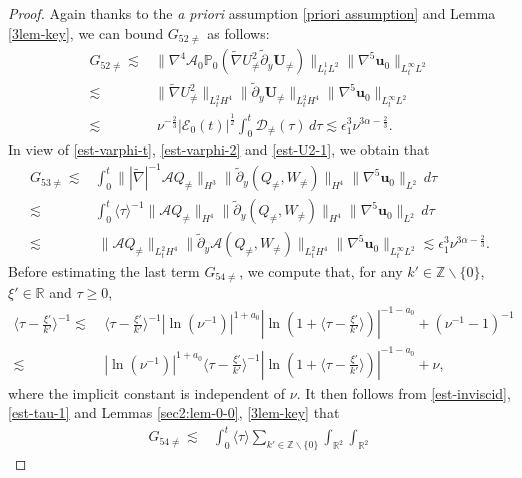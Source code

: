 \documentclass[11pt,reqno]{article}
\numberwithin{equation}{section}
\newcommand\R{{\mathbb R}}
\newcommand\Z{{\mathbb Z}}
\newcommand\PP{{\mathbb P}}
\newcommand\D{{\mathcal D}}
\newcommand\E{{\mathcal E}}
\newcommand\A{\mathcal{A}}
\newcommand\uu{\bm{u}}
\newcommand\U{\bm{U}}
\let\pa=\partial
\let\na=\nabla
\let\al=\alpha
\let\f=\frac
\let\ep=\epsilon
\begin{document}
\begin{proof}
Again thanks to the \textit{a priori} assumption \eqref{priori assumption} and Lemma \ref{3lem-key}, we can bound $G_{52\not=}$ as follows:
\begin{align}\label{est-G52noq}
    G_{52\not=}
    \lesssim &
    \|\nabla^4\A_0\PP_0(\widetilde{\nabla}U^2_{\not=}\tilde\pa_y\U_{\not=})\|_{L^1_tL^2}
    \|\nabla^5 \uu_0\|_{L^\infty_tL^2}
    \nonumber
    \\
    \lesssim &
    \|\widetilde{\nabla}U^2_{\not=}\|_{L^2_tH^4}
    \|\tilde\pa_y\U_{\not=}\|_{L^2_tH^4}
    \|\nabla^5 \uu_0\|_{L^\infty_tL^2}
    \nonumber
    \\
    \lesssim &~\nu^{-\f23} |\E_{0}(t)|^{\f12}\int_0^t \D_{\not=}(\tau)\,d\tau 
    \lesssim \ep_1^3 \nu^{3\al-\f23}.
\end{align}
In view of \eqref{est-varphi-t}, \eqref{est-varphi-2} and \eqref{est-U2-1}, we obtain that
\begin{align}\label{est-G53noq}
    G_{53\not=}
    \lesssim &
    \int_0^t
    \|{|\widetilde\na|}^{-1} \A Q_{\not=}\|_{H^3}
    \|\tilde\pa_y (Q_{\not=},W_{\not=})\|_{H^4}
    \|\nabla^5 \uu_0\|_{L^2}\,d\tau
    \nonumber
    \\
    \lesssim &
    \int_0^t \langle \tau \rangle^{-1} \|\A Q_{\not=}\|_{H^4}
    \|\tilde\pa_y (Q_{\not=},W_{\not=})\|_{H^4}
    \|\nabla^5 \uu_0\|_{L^2}\,d\tau
    \nonumber
    \\
    \lesssim& ~
    \|\A Q_{\not=}\|_{L^2_tH^4}
    \|\tilde\pa_y \A(Q_{\not=},W_{\not=})\|_{L^2_tH^4}
    \|\nabla^5 \uu_0\|_{L^\infty_tL^2}
    \lesssim \ep_1^3 \nu^{3\al-\f23}.
\end{align}
 Before estimating the last term $G_{54\not=}$, we compute that, for any $k'\in \Z\backslash\{0\}$, $\xi'\in\R$ and $\tau\geq 0$,
\begin{align}\label{est-tau-1}
	\langle \tau-\f{\xi'}{k'}\rangle^{-1} 
	\lesssim &~\langle \tau-\f{\xi'}{k'}\rangle^{-1} |\ln(\nu^{-1})|^{1+a_0}
	|\ln(1+\langle \tau-\f{\xi'}{k'} \rangle)|^{-1-a_0}
	+(\nu^{-1}-1)^{-1}
	\nonumber
	\\
	\lesssim &~|\ln(\nu^{-1})|^{1+a_0}\langle \tau-\f{\xi'}{k'}\rangle^{-1} |\ln(1+\langle \tau-\f{\xi'}{k'} \rangle)|^{-1-a_0}+ \nu,
\end{align}
where the implicit constant is independent of $\nu.$
It then follows from \eqref{est-inviscid}, \eqref{est-tau-1} and Lemmas \ref{sec2:lem-0-0}, \ref{3lem-key} that
\begin{align}\label{est-G54noq}
	G_{54\not=}
	\lesssim &
	\int_0^t \langle \tau \rangle  
	\sum_{k'\in\Z\backslash\{0\}}\int_{\R^2}\int_{\R^2} 

\end{align}
\end{proof}
\end{document}
